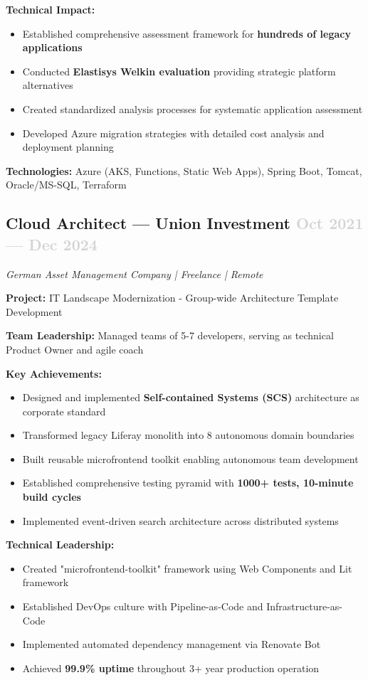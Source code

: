 \documentclass[11pt,a4paper]{article}
\begin{document}
\textbf{Technical Impact:}
\begin{itemize}
    \item Established comprehensive assessment framework for \textbf{hundreds of legacy applications}
    \item Conducted \textbf{Elastisys Welkin evaluation} providing strategic platform alternatives
    \item Created standardized analysis processes for systematic application assessment
    \item Developed Azure migration strategies with detailed cost analysis and deployment planning
\end{itemize}

\textbf{Technologies:} Azure (AKS, Functions, Static Web Apps), Spring Boot, Tomcat, Oracle/MS-SQL, Terraform

\subsection{Cloud Architect — Union Investment \hfill \textcolor{lightgray}{Oct 2021 — Dec 2024}}
\textsl{German Asset Management Company | Freelance | Remote}

\textbf{Project:} IT Landscape Modernization - Group-wide Architecture Template Development

\textbf{Team Leadership:} Managed teams of 5-7 developers, serving as technical Product Owner and agile coach

\textbf{Key Achievements:}
\begin{itemize}
    \item Designed and implemented \textbf{Self-contained Systems (SCS)} architecture as corporate standard
    \item Transformed legacy Liferay monolith into 8 autonomous domain boundaries
    \item Built reusable microfrontend toolkit enabling autonomous team development
    \item Established comprehensive testing pyramid with \textbf{1000+ tests, 10-minute build cycles}
    \item Implemented event-driven search architecture across distributed systems
\end{itemize}

\textbf{Technical Leadership:}
\begin{itemize}
    \item Created "microfrontend-toolkit" framework using Web Components and Lit framework
    \item Established DevOps culture with Pipeline-as-Code and Infrastructure-as-Code
    \item Implemented automated dependency management via Renovate Bot
    \item Achieved \textbf{99.9\% uptime} throughout 3+ year production operation
\end{itemize}
\end{document}
